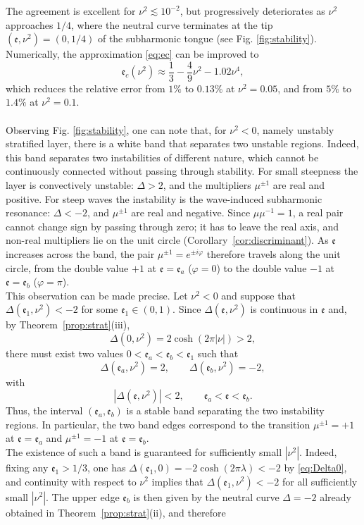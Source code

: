 \documentclass[reqno]{amsart}
\newcommand{\ee}{\mathfrak{e}}
\begin{document}
The agreement is excellent for $\nu^2\lesssim10^{-2}$, but progressively deteriorates as $\nu^2$ approaches $1/4$, where the neutral curve terminates at the tip $(\ee,\nu^2)=(0,1/4)$ of the subharmonic tongue (see Fig. \ref{fig:stability}). Numerically, the approximation \eqref{eq:ec} can be improved to
\begin{equation}\label{eq:ec+}
\ee_c(\nu^2)\approx\frac{1}{3}-\frac{4}{9}\nu^2-1.02\nu^4,
\end{equation}
which reduces the relative error from $1\%$ to $0.13\%$ at $\nu^2=0.05$, and from $5\%$ to $1.4\%$ at $\nu^2=0.1$.\\
\\
Observing Fig. \ref{fig:stability}, one can note that, for $\nu^2<0$, namely unstably stratified layer, there is a white band that separates two unstable regions. Indeed, this band separates two instabilities of different nature, which cannot be continuously connected without passing through stability. For small steepness the layer is convectively unstable: $\Delta>2$, and the multipliers $\mu^{\pm1}$ are real and positive. For steep waves the instability is the wave-induced subharmonic resonance: $\Delta<-2$, and $\mu^{\pm1}$ are real and negative. Since $\mu\mu^{-1}=1$, a real pair cannot change sign by passing through zero; it has to leave the real axis, and non-real multipliers lie on the unit circle (Corollary~\ref{cor:discriminant}). As $\ee$ increases across the band, the pair $\mu^{\pm1}=e^{\pm i\varphi}$ therefore travels along the unit circle, from the double value $+1$ at $\ee=\ee_a$ ($\varphi=0$) to the double value $-1$ at $\ee=\ee_b$ ($\varphi=\pi$).\\
This observation can be made precise. Let $\nu^2<0$ and suppose that $\Delta(\ee_1,\nu^2)<-2$ for some $\ee_1\in(0,1)$. Since $\Delta(\ee,\nu^2)$ is continuous in $\ee$ and, by Theorem~\ref{prop:strat}(iii),
$$
\Delta(0,\nu^2)=2\cosh(2\pi|\nu|)>2,
$$
there must exist two values $0<\ee_a<\ee_b<\ee_1$ such that
$$
\Delta(\ee_a,\nu^2)=2,\qquad
\Delta(\ee_b,\nu^2)=-2,
$$
with
$$
|\Delta(\ee,\nu^2)|<2,\qquad \ee_a<\ee<\ee_b.
$$
Thus, the interval $(\ee_a,\ee_b)$ is a stable band separating the two instability regions. In particular, the two band edges correspond to the transition $\mu^{\pm1}=+1$ at $\ee=\ee_a$ and $\mu^{\pm1}=-1$ at $\ee=\ee_b$.\\
The existence of such a band is guaranteed for sufficiently small $|\nu^2|$. Indeed, fixing any $\ee_1>1/3$, one has $\Delta(\ee_1,0)=-2\cosh(2\pi\lambda)<-2$ by \eqref{eq:Delta0}, and continuity with respect to $\nu^2$ implies that $\Delta(\ee_1,\nu^2)<-2$ for all sufficiently small $|\nu^2|$. The upper edge $\ee_b$ is then given by the neutral curve $\Delta=-2$ already obtained in Theorem~\ref{prop:strat}(ii), and therefore
\end{document}
